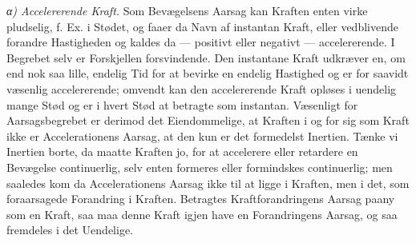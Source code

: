 \documentclass[12pt,a4paper]{book}
\newcommand{\subrunin}[1]{\emph{#1}\hspace{0.4em}}
\begin{document}
\subrunin{α) Accelererende Kraft.} Som Bevægelsens Aarsag kan Kraften
enten virke pludselig, f. Ex. i Stødet, og faaer da Navn af instantan
Kraft, eller vedblivende forandre Hastigheden og kaldes da --- positivt
eller negativt --- accelererende. I Begrebet selv er Forskjellen
forsvindende. Den instantane Kraft udkræver en, om end nok saa lille,
endelig Tid for at bevirke en endelig Hastighed og er for\-%
saavidt væsenlig accelererende; omvendt kan den accelererende Kraft
opløses i uendelig mange Stød og er i hvert Stød at betragte som
instantan. Væsenligt for Aarsagsbegrebet er derimod det Eiendommelige, at
Kraften i og for sig som Kraft ikke er Accelerationens Aarsag, at den kun
er det formedelst Inertien. Tænke vi Inertien borte, da maatte Kraften
jo, for at accelerere eller retardere en Bevægelse continuerlig, selv
enten formeres eller formindskes continuerlig; men saaledes kom da
Accelerationens Aarsag ikke til at ligge i Kraften, men i det, som
foraarsagede Forandring i Kraften. Betragtes Kraftforandringens Aarsag
paany som en Kraft, saa maa denne Kraft igjen have en Forandringens
Aarsag, og saa fremdeles i det Uendelige.
\end{document}
